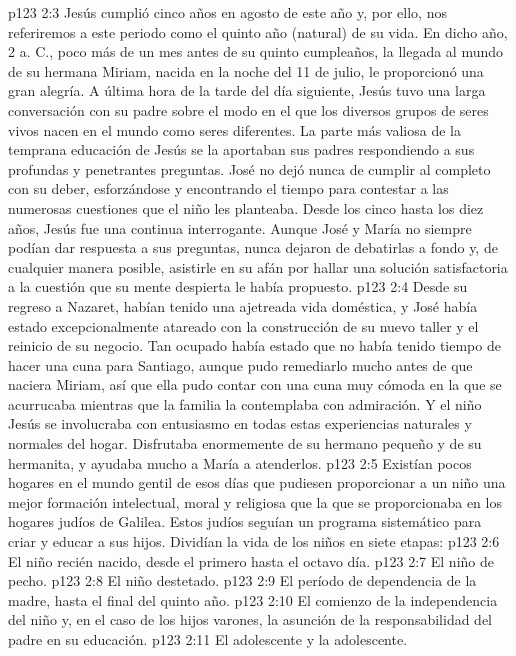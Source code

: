 \vs p123 2:3 \pc Jesús cumplió cinco años en agosto de este año y, por ello, nos referiremos a este periodo como el quinto año (natural) de su vida. En dicho año, 2 a. C., poco más de un mes antes de su quinto cumpleaños, la llegada al mundo de su hermana Miriam, nacida en la noche del 11 de julio, le proporcionó una gran alegría. A última hora de la tarde del día siguiente, Jesús tuvo una larga conversación con su padre sobre el modo en el que los diversos grupos de seres vivos nacen en el mundo como seres diferentes. La parte más valiosa de la temprana educación de Jesús se la aportaban sus padres respondiendo a sus profundas y penetrantes preguntas. José no dejó nunca de cumplir al completo con su deber, esforzándose y encontrando el tiempo para contestar a las numerosas cuestiones que el niño les planteaba. Desde los cinco hasta los diez años, Jesús fue una continua interrogante. Aunque José y María no siempre podían dar respuesta a sus preguntas, nunca dejaron de debatirlas a fondo y, de cualquier manera posible, asistirle en su afán por hallar una solución satisfactoria a la cuestión que su mente despierta le había propuesto.
\vs p123 2:4 Desde su regreso a Nazaret, habían tenido una ajetreada vida doméstica, y José había estado excepcionalmente atareado con la construcción de su nuevo taller y el reinicio de su negocio. Tan ocupado había estado que no había tenido tiempo de hacer una cuna para Santiago, aunque pudo remediarlo mucho antes de que naciera Miriam, así que ella pudo contar con una cuna muy cómoda en la que se acurrucaba mientras que la familia la contemplaba con admiración. Y el niño Jesús se involucraba con entusiasmo en todas estas experiencias naturales y normales del hogar. Disfrutaba enormemente de su hermano pequeño y de su hermanita, y ayudaba mucho a María a atenderlos.
\vs p123 2:5 Existían pocos hogares en el mundo gentil de esos días que pudiesen proporcionar a un niño una mejor formación intelectual, moral y religiosa que la que se proporcionaba en los hogares judíos de Galilea. Estos judíos seguían un programa sistemático para criar y educar a sus hijos. Dividían la vida de los niños en siete etapas:
\vs p123 2:6 El niño recién nacido, desde el primero hasta el octavo día.
\vs p123 2:7 El niño de pecho.
\vs p123 2:8 El niño destetado.
\vs p123 2:9 El período de dependencia de la madre, hasta el final del quinto año.
\vs p123 2:10 El comienzo de la independencia del niño y, en el caso de los hijos varones, la asunción de la responsabilidad del padre en su educación.
\vs p123 2:11 El adolescente y la adolescente.

